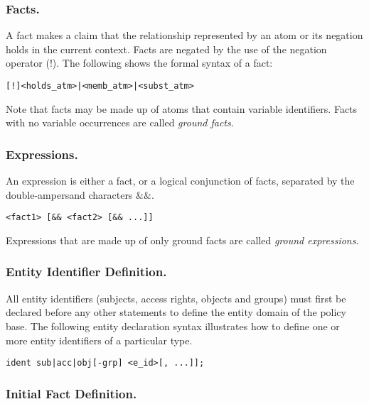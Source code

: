 \documentclass[11pt]{llncs}
\begin{document}
      \subsubsection{Facts.}

        A fact makes a claim that the relationship represented by an atom or
        its negation holds in the current context. Facts are negated by the
        use of the negation operator ($!$). The following shows the formal
        syntax of a fact:

        \begin{verbatim}[!]<holds_atm>|<memb_atm>|<subst_atm>\end{verbatim}

        Note that facts may be made up of atoms that contain variable
        identifiers. Facts with no variable occurrences are called {\em ground
        facts}.

      \subsubsection{Expressions.}

        An expression is either a fact, or a logical conjunction of facts,
        separated by the double-ampersand characters $\&\&$.

        \begin{verbatim}<fact1> [&& <fact2> [&& ...]]\end{verbatim}

        Expressions that are made up of only ground facts are called
        {\em ground expressions}.

      \subsubsection{Entity Identifier Definition.}

        All entity identifiers (subjects, access rights, objects and groups)
        must first be declared before any other statements to define the
        entity domain of the policy base. The following entity declaration
        syntax illustrates how to define one or more entity identifiers of a
        particular type.

        \begin{verbatim}ident sub|acc|obj[-grp] <e_id>[, ...]];\end{verbatim}

      \subsubsection{Initial Fact Definition.}
\end{document}
